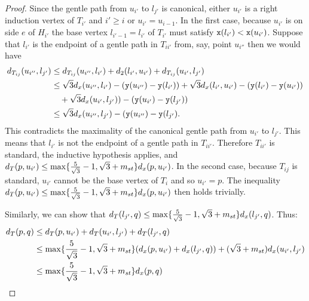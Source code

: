 \begin{proof}
Since the gentle path from $u_{i'}$ to $l_{j'}$ is canonical, either $u_{i'}$ 
is a right induction vertex of $T_{i'}$ and $i' \geq i$ or $u_{i'}=u_{i-1}$.
In the first case, because $u_{i'}$ is on side $e$ of $H_{i'}$ the base
vertex $l_{i'-1}=l_{i'}$ of $T_{i'}$ must satisfy 
${\tt x}(l_{i'}) < {\tt x}(u_{i'})$. Suppose that
$l_{i'}$ is the endpoint of a gentle path in $T_{ii'}$ from, say, point
$u_{i''}$ then we would have
\begin{align*}
d_{T_{ij}} (u_{i''},l_{j'}) & \leq d_{T_{ij}}(u_{i''},l_{i'}) + d_2(l_{i'},u_{i'}) + d_{T_{ij}}(u_{i'},l_{j'}) \\
             & \leq \sqrt{3}d_x(u_{i''},l_{i'})-({\tt y}(u_{i''})-{\tt y}(l_{i'})) + \sqrt{3}d_x(l_{i'},u_{i'}) - ({\tt y}(l_{i'})-{\tt y}(u_{i'})) \\
             & \quad + \sqrt{3}d_x(u_{i'},l_{j'})) - ({\tt y}(u_{i'})-{\tt y}(l_{j'})) \\
             & \leq \sqrt{3}d_x(u_{i''},l_{j'})-({\tt y}(u_{i''})-{\tt y}(l_{j'}).
\end{align*}
This contradicts the maximality of the canonical gentle path from $u_{i'}$ to
$l_{j'}$. This means that $l_{i'}$ is not the endpoint of a gentle path in
$T_{ii'}$. Therefore $T_{ii'}$ is standard, the inductive hypothesis
applies, and $d_T(p,u_{i'}) \leq \max\{\frac{5}{\sqrt{3}}-1, \sqrt{3}+m_{st}\}d_x(p,u_{i'})$. 
In the second case, because $T_{ij}$ is standard, $u_{i'}$
cannot be the base vertex of $T_i$ and so $u_{i'}=p$. The 
inequality $d_T(p,u_{i'}) \leq \max\{\frac{5}{\sqrt{3}}-1, \sqrt{3}+m_{st}\}d_x(p,u_{i'})$ then
holds trivially. 

Similarly, we can show that
$d_T(l_{j'},q) \leq \max\{\frac{5}{\sqrt{3}}-1, \sqrt{3}+m_{st}\}d_x(l_{j'},q)$. Thus: 
\begin{align*} d_T(p,q) & \leq d_T(p,u_{i'})+d_T(u_{i'},l_{j'})+d_T(l_{j'},q) \\
                        & \leq \max\{\frac{5}{\sqrt{3}}-1, \sqrt{3}+m_{st}\}(d_x(p,u_{i'}) + d_x(l_{j'},q)) + (\sqrt{3}+m_{st})d_x(u_{i'},l_{j'}) \\
                        & \leq \max\{\frac{5}{\sqrt{3}}-1 , \sqrt{3}+m_{st}\}d_x(p,q)\end{align*}\end{proof}



